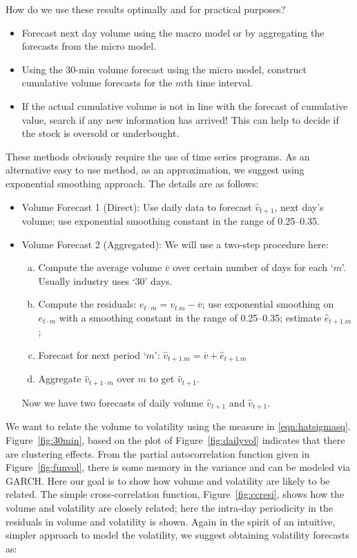 How do we use these results optimally and for practical purposes?
	\begin{itemize}
	\item Forecast next day volume using the macro model or by aggregating the forecasts from the micro model.
	\item Using the 30-min volume forecast using the micro model, construct cumulative volume forecasts for the $m$th time interval.
	\item If the actual cumulative volume is not in line with the forecast of cumulative value, search if any new information has arrived! This can help to decide if the stock is oversold or underbought. 
	\end{itemize}
	
	
These methods obviously require the use of time series programs. As an alternative easy to use method, as an approximation, we suggest using exponential smoothing approach. The details are as follows:
	\begin{itemize}
	\item Volume Forecast 1 (Direct): Use daily data to forecast $\hat{v}_{t+1}$, next day's volume; use exponential smoothing constant in the range of 0.25--0.35.
	\item Volume Forecast 2 (Aggregated): We will use a two-step procedure here:
		\begin{enumerate}[(a)]
		\item Compute the average volume $\overline{v}$ over certain number of days for each `$m$'. Usually industry uses `30' days.
		\item Compute the residuals: $e_{t\cdot m} = v_{t . m} - \overline{v}$; use exponential smoothing on $e_{t\cdot m}$ with a smoothing constant in the range of 0.25--0.35; estimate $\hat{e}_{t+1 . m}$;
		\item Forecast for next period `$m$': $\hat{v}_{t+1. m}=\overline{v}+\hat{e}_{t+1 . m}$
		\item Aggregate $\hat{v}_{t+1\cdot m}$ over $m$ to get $\hat{v}_{t+1}$. 
		\end{enumerate}
	Now we have two forecasts of daily volume $\hat{v}_{t+1}$ and $\hat{v}_{t+1}$.
	\end{itemize}
We want to relate the volume to volatility using the measure in \eqref{eqn:hatsigmasq}. Figure~\ref{fig:30min}, based on the plot of Figure~\ref{fig:dailyvol} indicates that there are clustering effects. From the partial autocorrelation function given in Figure~\ref{fig:funvol}, there is some memory in the variance and can be modeled via GARCH. Here our goal is to show how volume and volatility are likely to be related. The simple cross-correlation function, Figure~\ref{fig:ccresi}, shows how the volume and volatility are closely related; here the intra-day periodicity in the residuals in volume and volatility is shown. Again in the spirit of an intuitive, simpler approach to model the volatility, we suggest obtaining volatility forecasts as:
